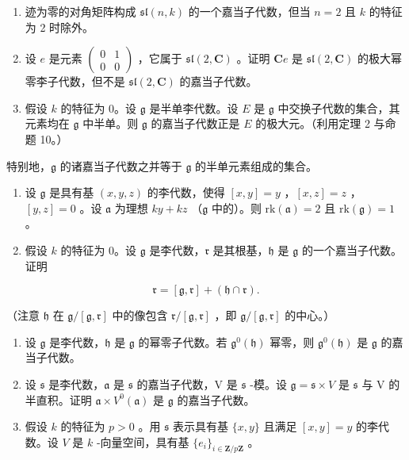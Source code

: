 
\begin{enumerate}
\def\labelenumi{\arabic{enumi})}
\item
  迹为零的对角矩阵构成 \(\mathfrak{sl}(n,k)\) 的一个嘉当子代数，但当 \(n = 2\) 且 \(k\) 的特征为 2 时除外。
\item
  设 \(e\) 是元素 \(\begin{pmatrix} 0 & 1 \\ 0 & 0 \end{pmatrix}\) ，它属于 \(\mathfrak{sl}(2, \mathbf{C})\) 。证明 \(\mathbf{C}e\) 是 \(\mathfrak{sl}(2, \mathbf{C})\) 的极大幂零李子代数，但不是 \(\mathfrak{sl}(2, \mathbf{C})\) 的嘉当子代数。
\item
  假设 \(k\) 的特征为 0。设 \(\mathfrak{g}\) 是半单李代数。设 \(E\) 是 \(\mathfrak{g}\) 中交换子代数的集合，其元素均在 \(\mathfrak{g}\) 中半单。则 \(\mathfrak{g}\) 的嘉当子代数正是 \(E\) 的极大元。（利用定理 2 与命题 10。）
\end{enumerate}

特别地，\(\mathfrak{g}\) 的诸嘉当子代数之并等于 \(\mathfrak{g}\) 的半单元素组成的集合。

\begin{enumerate}
\def\labelenumi{\arabic{enumi})}
\setcounter{enumi}{3}
\item
  设 \(\mathfrak{g}\) 是具有基 \((x,y,z)\) 的李代数，使得 \([x,y] = y\) ，\([x,z] = z\) ，\([y,z] = 0\) 。设 \(\mathfrak{a}\) 为理想 \(ky + kz\) （\(\mathfrak{g}\) 中的）。则 \(\mathrm{rk}(\mathfrak{a}) = 2\) 且 \(\mathrm{rk}(\mathfrak{g}) = 1\) 。
\item
  假设 \(k\) 的特征为 0。设 \(\mathfrak{g}\) 是李代数，\(\mathfrak{r}\) 是其根基，\(\mathfrak{h}\) 是 \(\mathfrak{g}\) 的一个嘉当子代数。证明
\end{enumerate}

\[
\mathfrak {r} = [ \mathfrak {g}, \mathfrak {r} ] + (\mathfrak {h} \cap \mathfrak {r}).
\]

（注意 \(\mathfrak{h}\) 在 \(\mathfrak{g}/[\mathfrak{g},\mathfrak{r}]\) 中的像包含 \(\mathfrak{r}/[\mathfrak{g},\mathfrak{r}]\) ，即 \(\mathfrak{g}/[\mathfrak{g},\mathfrak{r}]\) 的中心。）

\begin{enumerate}
\def\labelenumi{\arabic{enumi})}
\setcounter{enumi}{5}
\item
  设 \(\mathfrak{g}\) 是李代数，\(\mathfrak{h}\) 是 \(\mathfrak{g}\) 的幂零子代数。若 \(\mathfrak{g}^0 (\mathfrak{h})\) 幂零，则 \(\mathfrak{g}^0 (\mathfrak{h})\) 是 \(\mathfrak{g}\) 的嘉当子代数。
\item
  设 \(\mathfrak{s}\) 是李代数，\(\mathfrak{a}\) 是 \(\mathfrak{s}\) 的嘉当子代数，V 是 \(\mathfrak{s}\) -模。设 \(\mathfrak{g} = \mathfrak{s} \times V\) 是 \(\mathfrak{s}\) 与 V 的半直积。证明 \(\mathfrak{a} \times V^0(\mathfrak{a})\) 是 \(\mathfrak{g}\) 的嘉当子代数。
\item
  假设 \(k\) 的特征为 \(p > 0\) 。用 \(\mathfrak{s}\) 表示具有基 \(\{x, y\}\) 且满足 \([x, y] = y\) 的李代数。设 \(V\) 是 \(k\) -向量空间，具有基 \(\{e_i\}_{i \in \mathbf{Z}/p\mathbf{Z}}\) 。
\end{enumerate}

